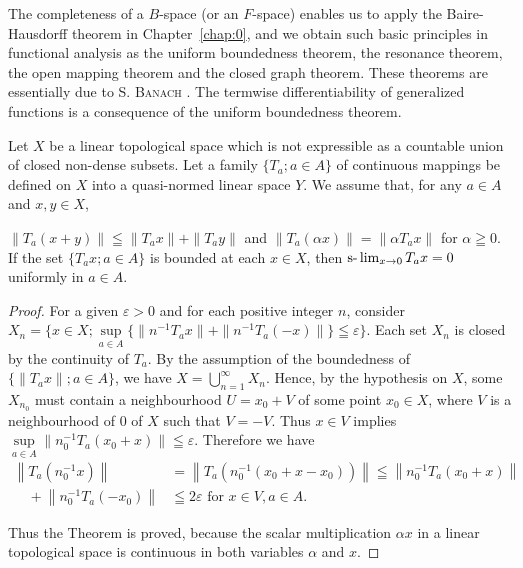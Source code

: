 \label{chap:II}

The completeness of a $B$-space (or an $F$-space) enables us to apply the Baire-Hausdorff theorem in Chapter~\ref{chap:0}, and we obtain such basic principles in functional analysis as the uniform boundedness theorem, the resonance theorem, the open mapping theorem and the closed graph theorem. These theorems are essentially due to S. \textsc{Banach} \cite{banach9}. The termwise differentiability of generalized functions is a consequence of the uniform boundedness theorem. 


\label{sec:II.1}

\begin{theorem}\label{thm:II.1.Theorem.1} Let $X$ be a linear topological space which is not expressible as a countable union of closed non-dense subsets. Let a family $\{T_{a}; a \in A\}$ of continuous mappings be defined on $X$ into a quasi-normed linear space $Y$. We assume that, for any $a \in A$ and $x, y \in X$, 

$\|T_a(x+y)\|\leqq\|T_a x\|+\|T_a y\|$ and $\|T_a(\alpha x)\|=\|\alpha T_a x\|$ for $\alpha\geqq0$. If the set $\{T_a x;a\in A\}$ is bounded at each $x\in X$, then $\text{s-}\lim\nolimits_{x\to 0}T_a x=0$ uniformly in $a\in A$. 
\end{theorem}

\begin{proof}
 For a given $\varepsilon > 0$ and for each positive integer $n$, consider $X_{n} = \{x \in X; \sup\limits_{a \in A} \{\|n^{-1}T_{a}x\| + \|n^{-1}T_{a}(-x)\|\} \leqq \varepsilon\}$. Each set $X_{n}$ is closed by the continuity of $T_{a}$. By the assumption of the boundedness of $\{\|T_{a}x\|; a \in A\}$, we have $X = \bigcup\limits_{n=1}^{\infty} X_{n}$. Hence, by the hypothesis on $X$, some $X_{n_{0}}$ must contain a neighbourhood $U = x_{0} + V$ of some point $x_{0} \in X$, where $V$ is a neighbourhood of $0$ of $X$ such that $V = -V$. Thus $x \in V$ implies $\sup\limits_{a \in A} \|n_{0}^{-1}T_{a}(x_{0} + x)\| \leqq \varepsilon$. Therefore we have 
\[
\begin{aligned}
\left\| T _{a} (n _{0} ^{-1} x) \right\|& = \left\| T _{a} (n _{0} ^{-1} (x _{0} + x - x _{0})) \right\| \leqq \left\| n _{0} ^{-1} T _{a} (x _{0} + x) \right\|
\\
\quad + \left\| n _{0} ^{-1} T _{a} (- x _{0}) \right\|& \leqq 2 \varepsilon \text{ for } x \in V, a \in A. \end{aligned}
\]

Thus the Theorem is proved, because the scalar multiplication $\alpha x$ in a linear topological space is continuous in both variables $\alpha$ and $x$. 
\end{proof}

